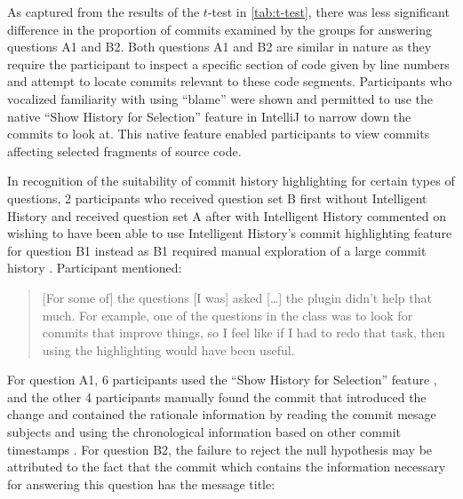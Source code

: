 As captured from the results of the $t$-test in \autoref{tab:t-test}, there was less significant difference in the proportion of commits examined by the groups for answering questions A1 and B2.
Both questions A1 and B2 are similar in nature as they require the participant to inspect a specific section of code given by line numbers and attempt to locate commits relevant to these code segments.
Participants who vocalized familiarity with using  ``blame'' were shown and permitted to use the native ``Show History for Selection'' feature in IntelliJ to narrow down the commits to look at.
This native feature enabled participants to view commits affecting selected fragments of source code.

In recognition of the suitability of commit history highlighting for certain types of questions,
2 participants who received question set B first without Intelligent History and received question set A after with Intelligent History commented on wishing to have been able to use Intelligent History's commit highlighting feature for question B1 instead as B1
required manual exploration of a large commit history .
Participant  mentioned:

\begin{quote}
  [For some of] the questions [I was] asked [\dots] the plugin didn’t help that much. 
  For example, one of the questions in the  class was to look for commits that improve things, 
  so I feel like if I had to redo that task, then using the highlighting would have been useful.
\end{quote}

For question A1, 6 participants used the ``Show History for Selection'' feature ,
and the other 4 participants manually found the commit that introduced the change and contained the rationale information by reading the commit mesage subjects and using the chronological information based on other commit timestamps .
For question B2, the failure to reject the null hypothesis may be attributed to the fact that the commit  which contains the information necessary for answering this question has the message title: 

\begin{center}
\end{center}


